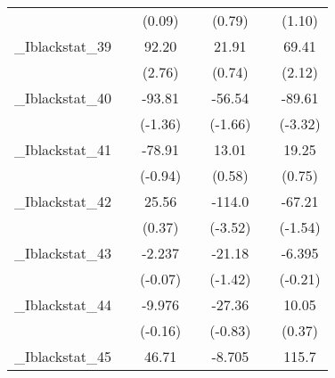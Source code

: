 {\begin{tabular}{l*{6}{c}}
            &                     &      (0.09)         &                     &      (0.79)         &                     &      (1.10)         \\
[1em]
\_Iblackstat\_39&                     &       92.20\sym{**} &                     &       21.91         &                     &       69.41\sym{*}  \\
            &                     &      (2.76)         &                     &      (0.74)         &                     &      (2.12)         \\
[1em]
\_Iblackstat\_40&                     &      -93.81         &                     &      -56.54         &                     &      -89.61\sym{**} \\
            &                     &     (-1.36)         &                     &     (-1.66)         &                     &     (-3.32)         \\
[1em]
\_Iblackstat\_41&                     &      -78.91         &                     &       13.01         &                     &       19.25         \\
            &                     &     (-0.94)         &                     &      (0.58)         &                     &      (0.75)         \\
[1em]
\_Iblackstat\_42&                     &       25.56         &                     &      -114.0\sym{**} &                     &      -67.21         \\
            &                     &      (0.37)         &                     &     (-3.52)         &                     &     (-1.54)         \\
[1em]
\_Iblackstat\_43&                     &      -2.237         &                     &      -21.18         &                     &      -6.395         \\
            &                     &     (-0.07)         &                     &     (-1.42)         &                     &     (-0.21)         \\
[1em]
\_Iblackstat\_44&                     &      -9.976         &                     &      -27.36         &                     &       10.05         \\
            &                     &     (-0.16)         &                     &     (-0.83)         &                     &      (0.37)         \\
[1em]
\_Iblackstat\_45&                     &       46.71         &                     &      -8.705         &                     &       115.7         \\

\end{tabular}}
